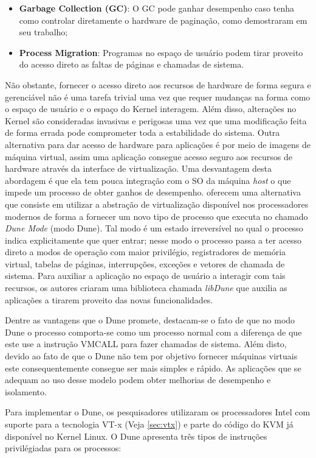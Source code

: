 \begin{itemize}
  \item \textbf{Garbage Collection (GC)}: O GC pode ganhar desempenho caso
        tenha como controlar diretamente o hardware de paginação, como
        \cite{pauseless} demostraram em seu trabalho;
  \item \textbf{Process Migration}: Programas no espaço de usuário podem tirar
        proveito do acesso direto as faltas de páginas e chamadas de sistema.
\end{itemize}

Não obstante, fornecer o acesso direto aos recursos de hardware de forma segura
e gerenciável não é uma tarefa trivial uma vez que requer mudanças na forma
como o espaço de usuário e o espaço do Kernel interagem. Além disso, alterações
no Kernel são consideradas invasivas e perigosas uma vez que uma modificação
feita de forma errada pode comprometer toda a estabilidade do sistema. Outra
alternativa para dar acesso de hardware para aplicações é por meio de imagens
de máquina virtual, assim uma aplicação consegue acesso seguro aos recursos de
hardware através da interface de virtualização. Uma desvantagem desta abordagem
é que ela tem pouca integração com o SO da máquina \emph{host} o que impede um
processo de obter ganhos de desempenho. \cite{belay} oferecem uma alternativa
que consiste em utilizar a abstração de virtualização disponível nos
processadores modernos de forma a fornecer um novo tipo de processo que executa
no chamado \emph{Dune Mode} (modo Dune). Tal modo é um estado irreversível no
qual o processo indica explicitamente que quer entrar; nesse modo o processo
passa a ter acesso direto a modos de operação com maior privilégio,
registradores de memória virtual, tabelas de páginas, interrupções, exceções e
vetores de chamada de sistema. Para auxiliar a aplicação no espaço de usuário a
interagir com tais recursos, os autores criaram uma biblioteca chamada
\emph{libDune} que auxilia as aplicações a tirarem proveito das novas
funcionalidades.

Dentre as vantagens que o Dune promete, destacam-se o fato de que no modo Dune
o processo comporta-se como um processo normal com a diferença de que este use
a instrução VMCALL para fazer chamadas de sistema. Além disto, devido ao fato
de que o Dune não tem por objetivo fornecer máquinas virtuais este
consequentemente consegue ser mais simples e rápido. As aplicações que se
adequam ao uso desse modelo podem obter melhorias de desempenho e isolamento.

Para implementar o Dune, os pesquisadores utilizaram os processadores Intel com
suporte para a tecnologia VT-x (Veja \ref{sec:vtx}) e parte do código do KVM já
disponível no Kernel Linux. O Dune apresenta três tipos de instruções
privilégiadas para os processos:

